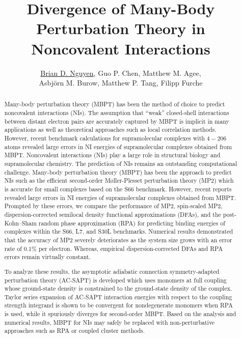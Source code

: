 \documentclass[12pt]{article}
\title{Divergence of Many-Body Perturbation Theory in Noncovalent Interactions}
\author{\underline{Brian D. Nguyen},
  Guo P. Chen, Matthew M. Agee, \\ Asbj{\"o}rn M. Burow,
  Matthew P. Tang,
  Filipp Furche}
\begin{document}
\maketitle

\begin{abstract}
  Many-body perturbation theory (MBPT) has been the method of choice to
  predict noncovalent interactions (NIs). The assumption that ``weak''
  closed-shell interactions between distant electron pairs are accurately
  captured by MBPT is implicit in many applications as well as theoretical
  approaches such as local correlation methods. However, recent benchmark
  calculations for supramolecular complexes with $4-206$ atoms revealed
  large errors in NI energies of supramolecular complexes obtained from MBPT.
  Noncovalent interactions (NIs) play a large role in structural biology
  and supramolecular chemistry. The prediction of NIs remains an outstanding
  computational challenge. Many-body perturbation theory (MBPT) has been the
  approach to predict NIs such as the efficient second-order M{\o}ller-Plesset
  perturbation theory (MP2) which is accurate for small complexes
  based on the S66 benchmark. However, recent reports revealed large errors
  in NI energies of supramolecular complexes obtained from MBPT.
  Prompted by these errors, we compare the performance of MP2, spin-scaled MP2,
  dispersion-corrected semilocal density functional approximations (DFAs),
  and the post-Kohn--Sham random phase approximation (RPA) for predicting binding
  energies of complexes within the S66, L7, and S30L benchmarks. Numerical
  results demonstrated that the accuracy of MP2 severely deteriorates as
  the system size grows with an error rate of $0.1\%$ per electron.
  Whereas, empirical dispersion-corrected DFAs and RPA errors remain virtually
  constant.

  To analyze these results, the asymptotic adiabatic connection
  symmetry-adapted perturbation theory (AC-SAPT) is developed which uses
  monomers at full coupling whose ground-state density is constrained to
  the ground-state density of the complex. Taylor series expansion of AC-SAPT
  interaction energies with respect to the coupling strength integrand is
  shown to be convergent for nondegenerate monomers when RPA is used, while it
  spuriously diverges for second-order MBPT. Based on the analysis and numerical
  results, MBPT for NIs may safely be replaced with non-perturbative approaches
  such as RPA or coupled cluster methods.

\end{abstract}
\end{document}
